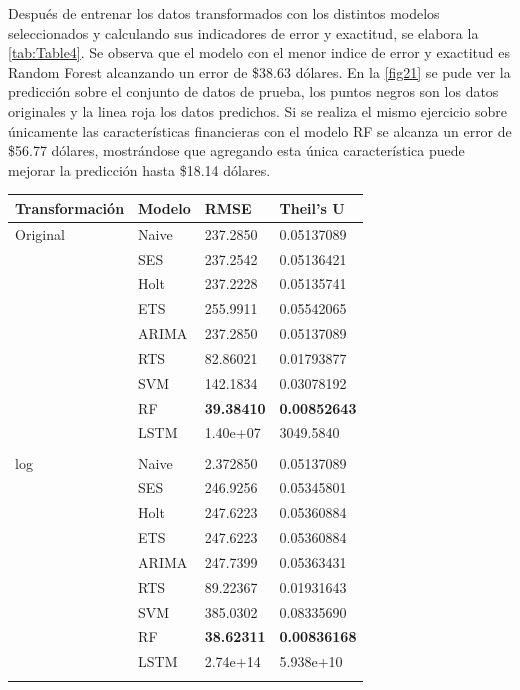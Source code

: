 Después de entrenar los datos transformados con los distintos modelos seleccionados y calculando sus indicadores de error y exactitud, se elabora la \autoref{tab:Table4}. Se observa que el modelo con el menor indice de error y exactitud es Random Forest alcanzando un error de \$38.63 dólares.
En la \autoref{fig21} se pude ver la predicción sobre el conjunto de datos de prueba, los puntos negros son los datos originales y la linea roja los datos predichos. Si se realiza el mismo ejercicio sobre únicamente las características financieras con el modelo RF se alcanza un error de \$56.77 dólares, mostrándose que agregando esta única característica puede mejorar la predicción hasta \$18.14 dólares.
 
\begin{table}
	\centering
	\begin{adjustbox}{width=0.83\textwidth}
	\begin{tabular}{m{5cm} m{3.5cm} m{3cm} m{3cm} }
		\toprule
		\textbf{Transformación} & \textbf{Modelo} & \textbf{RMSE} & \textbf{Theil’s U}\\
		\midrule
		Original&Naive & 237.2850  & 0.05137089\\
		&SES   & 237.2542  & 0.05136421\\
		&Holt  & 237.2228  & 0.05135741\\
		&ETS   & 255.9911  & 0.05542065\\
		&ARIMA & 237.2850  & 0.05137089\\
		&RTS   & 82.86021   & 0.01793877\\
		&SVM   & 142.1834   & 0.03078192\\
		&RF    & \textbf{39.38410}   & \textbf{0.00852643}\\
		&LSTM  & 1.40e+07  & 3049.5840\\ \\
		log	&Naive & 2.372850  & 0.05137089\\
		&SES   & 246.9256  & 0.05345801\\
		&Holt  & 247.6223  & 0.05360884\\
		&ETS   & 247.6223  & 0.05360884\\
		&ARIMA & 247.7399 & 0.05363431\\
		&RTS   & 89.22367   & 0.01931643\\
		&SVM   & 385.0302   & 0.08335690\\
		&RF    & \textbf{38.62311}   & \textbf{0.00836168}\\
		&LSTM  & 2.74e+14  & 5.938e+10\\ \\

\end{tabular}
\end{adjustbox}
\end{table}
